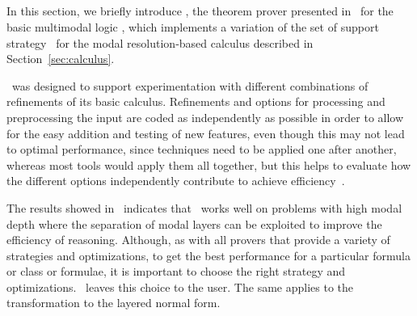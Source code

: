 \begin{example}
    
\end{example}

\begin{example}
    
\end{example}

\subsection{\ksp}
In this section, we briefly introduce \ksp, the theorem prover presented
in~\cite{Nalon2016} for the basic multimodal logic , which
implements a variation of the set of support strategy~\cite{wos1965efficiency}
for the modal resolution-based calculus described in Section~\ref{sec:calculus}.

\ksp\ was designed to support experimentation with different combinations of
refinements of its basic calculus. Refinements and options for processing and
preprocessing the input are coded as independently as possible in order to allow
for the easy addition and testing of new features, even though this may not lead
to optimal performance, since techniques need to be applied one after another,
whereas most tools would apply them all together, but this helps to evaluate how
the different options independently contribute to achieve
efficiency~\cite{Nalon2016}. 

The results showed in~\cite{Nalon2016} indicates that \ksp\ works well on
problems with high modal depth where the separation of modal layers can be
exploited to improve the efficiency of reasoning. Although, as with all provers
that provide a variety of strategies and optimizations, to get the best
performance for a particular formula or class or formulae, it is important to
choose the right strategy and optimizations. \ksp\ leaves this choice to the
user. The same applies to the transformation to the layered normal form.
